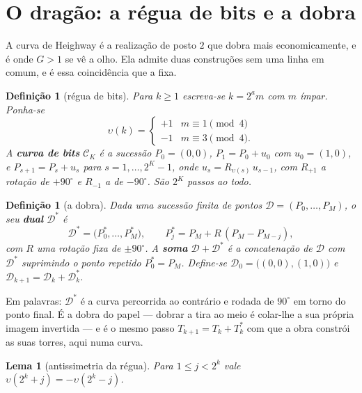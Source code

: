 \documentclass[11pt,a4paper]{article}
\newtheorem{lema}[teorema]{Lema}
\newtheorem{definicao}[teorema]{Definição}
\begin{document}
\section{O dragão: a régua de bits e a dobra}\label{sec:dragao}

\noindent A curva de Heighway é a realização de posto $2$ que dobra mais
economicamente, e é onde $G>1$ se vê a olho. Ela admite duas construções sem uma
linha em comum, e é essa coincidência que a fixa.

\begin{definicao}[régua de bits]\label{def:bits}
Para $k\ge1$ escreva-se $k=2^{a}m$ com $m$ ímpar. Ponha-se
\[
\upsilon(k)=\begin{cases}+1 & m\equiv1\pmod 4\\[2pt] -1 & m\equiv3\pmod 4.\end{cases}
\]
A \textbf{curva de bits} $\mathcal{C}_K$ é a sucessão $P_0=(0,0)$, $P_1=P_0+u_0$ com
$u_0=(1,0)$, e $P_{s+1}=P_s+u_s$ para $s=1,\dots,2^{K}-1$, onde
$u_{s}=R_{\upsilon(s)}\,u_{s-1}$, com $R_{+1}$ a rotação de $+90^{\circ}$ e
$R_{-1}$ a de $-90^{\circ}$. São $2^{K}$ passos ao todo.
\end{definicao}

\begin{definicao}[a dobra]\label{def:dobrar}
Dada uma sucessão finita de pontos $\mathcal{D}=(P_0,\dots,P_M)$, o seu \textbf{dual}
$\mathcal{D}^{*}$ é
\[
\mathcal{D}^{*}=\bigl(P^{*}_0,\dots,P^{*}_M\bigr),\qquad
P^{*}_j=P_M+R\,(P_M-P_{M-j}),
\]
com $R$ uma rotação fixa de $\pm90^{\circ}$. A \textbf{soma} $\mathcal{D}+\mathcal{D}^{*}$ é a
concatenação de $\mathcal{D}$ com $\mathcal{D}^{*}$ suprimindo o ponto repetido $P^{*}_0=P_M$. Define-se
$\mathcal{D}_0=\bigl((0,0),(1,0)\bigr)$ e $\mathcal{D}_{k+1}=\mathcal{D}_k+\mathcal{D}_k^{*}$.
\end{definicao}

\noindent Em palavras: $\mathcal{D}^{*}$ é a curva percorrida ao contrário e rodada de
$90^{\circ}$ em torno do ponto final. É a dobra do papel --- dobrar a tira ao
meio é colar-lhe a sua própria imagem invertida --- e é o mesmo passo
$T_{k+1}=T_k+T_k^{*}$ com que a obra constrói as suas torres, aqui numa curva.

\begin{lema}[antissimetria da régua]\label{lem:anti}
Para $1\le j<2^{k}$ vale $\upsilon(2^{k}+j)=-\upsilon(2^{k}-j)$.
\end{lema}
\end{document}
